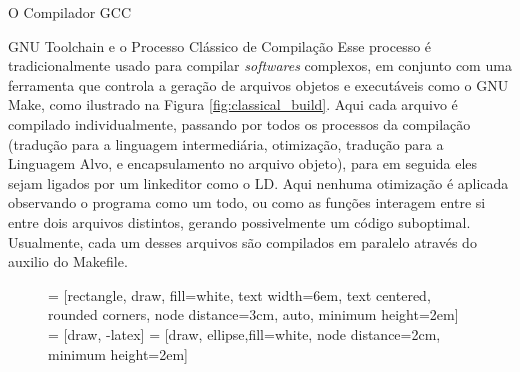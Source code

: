 \begin{section}{O Compilador GCC}
\begin{subsection}{GNU Toolchain e o Processo Clássico de Compilação}
Esse processo é tradicionalmente usado para compilar \textit{softwares} complexos,
em conjunto com uma ferramenta que controla a geração de arquivos objetos e executáveis
como o GNU Make, como ilustrado na Figura \ref{fig:classical_build}. Aqui cada arquivo
é compilado individualmente, passando por todos os processos da compilação (tradução
para a linguagem intermediária, otimização, tradução para a Linguagem Alvo,
e encapsulamento no arquivo objeto), para em seguida eles sejam ligados por um
linkeditor como o LD. Aqui nenhuma otimização é aplicada observando o programa
como um todo, ou como as funções interagem entre si entre dois arquivos distintos,
gerando possivelmente um código suboptimal. Usualmente, cada um desses arquivos
são compilados em paralelo através do auxilio do Makefile.



\begin{figure}
 = [rectangle, draw, fill=white,
    text width=6em, text centered, rounded corners, node distance=3cm, auto, minimum height=2em]
 = [draw, -latex]
 = [draw, ellipse,fill=white, node distance=2cm,
    minimum height=2em]
\begin{center}
\end{center}
\end{figure}
\end{subsection}
\end{section}
